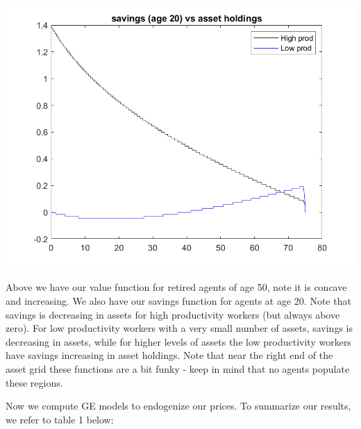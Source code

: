 \documentclass[11pt]{article} %
\begin{document}
\includegraphics{savings}

Above we have our value function for retired agents of age 50, note it is concave and increasing. We also have our savings function for agents at age 20. Note that savings is decreasing in assets for high productivity workers (but always above zero). For low productivity workers with a very small number of assets, savings is decreasing in assets, while for higher levels of assets the low productivity workers have savings increasing in asset holdings. Note that near the right end of the asset grid these functions are a bit funky - keep in mind that no agents populate these regions.

Now we compute GE models to endogenize our prices. To summarize our results, we refer to table 1 below:

\begin{center}

\end{center}
\end{document}
